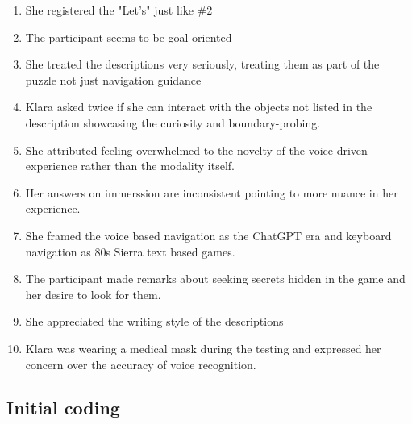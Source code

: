 \begin{enumerate}
    \item She registered the "Let's" just like \#2
    \item The participant seems to be goal-oriented
    \item She treated the descriptions very seriously, treating them as part of the puzzle not just navigation guidance
    \item Klara asked twice if she can interact with the objects not listed in the description showcasing the curiosity and boundary-probing.
    \item She attributed feeling overwhelmed to the novelty of the voice-driven experience rather than the modality itself.
    \item Her answers on immerssion are inconsistent pointing to more nuance in her experience.
    \item She framed the voice based navigation as the ChatGPT era and keyboard navigation as 80s Sierra text based games. 
    \item The participant made remarks about seeking secrets hidden in the game and her desire to look for them.
    \item She appreciated the writing style of the descriptions 
    \item Klara was wearing a medical mask during the testing and expressed her concern over the accuracy of voice recognition.
 
    
\end{enumerate}

\subsection{Initial coding}

